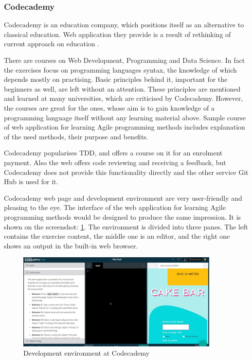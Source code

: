 \subsubsection{Codecademy}
Codecademy is an education company, which positions itself as an alternative to classical education. Web application they provide is a result of rethinking of current approach on education \cite[About]{codecademy}.

There are courses on Web Development, Programming and Data Science. In fact the exercises focus on programming languages syntax, the knowledge of which depends mostly on practising. Basic principles behind it, important for the beginners as well, are left without an attention. These principles are mentioned and learned at many universities, which are criticised by Codecademy. However, the courses are great for the ones, whose aim is to gain knowledge of a programming language itself without any learning material above. Sample course of web application for learning Agile programming methods includes explanation of the used methods, their purpose and benefits.

Codecademy popularises TDD, and offers a course on it for an enrolment payment. Also the web offers code reviewing and receiving a feedback, but Codecademy does not provide this functionality directly and the other service Git Hub is used for it.

Codecademy web page and development environment are very user-friendly and pleasing to the eye. The interface of the web application for learning Agile programming methods would be designed to produce the same impression. It is shown on the screenshot: \ref{fig:codecademy}. The environment is divided into three panes. The left contains the exercise content, the middle one is an editor, and the right one shows an output in the built-in web browser.

\begin{figure}[h]
    \centerline{\includegraphics[width=0.9\textwidth]{images/codecademy}}
    \caption{Development environment at Codecademy}
    \label{fig:codecademy}
\end{figure}

